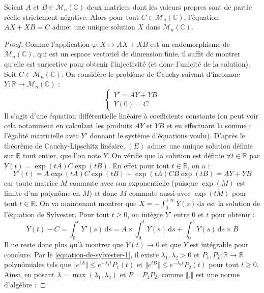 
  \begin{theorem}
    Soient $A$ et $B \in \mathcal{M}_n(\mathbb{C})$ deux matrices dont les valeurs propres sont de partie réelle strictement négative. Alors pour tout $C \in \mathcal{M}_n(\mathbb{C})$, l'équation $AX + XB = C$ admet une unique solution $X$ dans $\mathcal{M}_n(\mathbb{C})$.
  \end{theorem}

  \begin{proof}
    Comme l'application $\varphi : X \mapsto AX + XB$ est un endomorphisme de $\mathcal{M}_n(\mathbb{C})$, qui est un espace vectoriel de dimension finie, il suffit de montrer qu'elle est surjective pour obtenir l'injectivité (et donc l'unicité de la solution). Soit $C \in \mathcal{M}_n(\mathbb{C})$. On considère le problème de Cauchy suivant d'inconnue $Y : \mathbb{R} \rightarrow \mathcal{M}_n(\mathbb{C})$ :
    \[ \begin{cases} Y' = AY + YB \\ Y(0) = C \end{cases} \tag{$E$} \]
    Il s'agit d'une équation différentielle linéaire à coefficients constants (on peut voir cela notamment en calculant les produits $AY$ et $YB$ et en effectuant la somme ; l'égalité matricielle avec $Y'$ donnant le système d'équations voulu). D'après le théorème de Cauchy-Lipschitz linéaire, $(E)$ admet une unique solution définie sur $\mathbb{R}$ tout entier, que l'on note $Y$.
    \newpar
    On vérifie que la solution est définie $\forall t \in \mathbb{R}$ par $Y(t) = \exp(tA) C \exp(tB)$. En effet pour tout $t \in \mathbb{R}$, on a :
    \[ Y'(t) = A \exp(tA) C \exp(tB) + \exp(tA) CB \exp(tB) = AY + YB \]
    car toute matrice $M$ commute avec son exponentielle (puisque $\exp(M)$ est limite d'un polynôme en $M$) et donc $M$ commute aussi avec $\exp(tM)$ pour tout $t \in \mathbb{R}$.
    \newpar
    On va maintenant montrer que $X = - \int_{0}^{+\infty} Y(s) \, \mathrm{d}s$ est la solution de l'équation de Sylvester. Pour tout $t \geq 0$, on intègre $Y'$ entre $0$ et $t$ pour obtenir :
    \[ Y(t) - C = \int_0^t Y'(s) \, \mathrm{d}s = A \times \int_0^t Y(s) \, \mathrm{d}s + \int_0^t Y(s) \, \mathrm{d}s \times B \]
    Il ne reste donc plus qu'à montrer que $Y(t) \longrightarrow 0$ et que $Y$ est intégrable pour conclure. Par le \cref{equation-de-sylvester-1}, il existe $\lambda_1, \lambda_2 > 0$ et $P_1, P_2 : \mathbb{R} \rightarrow \mathbb{R}$ polynômiales tels que $\Vert e^{tA} \Vert \leq e^{- \lambda_1 t} P_1(t)$ et $\Vert e^{tB} \Vert \leq e^{-\lambda_2 t} P_2(t)$ pour tout $t \geq 0$. Ainsi, en posant $\lambda = \max(\lambda_1, \lambda_2)$ et $P = P_1 P_2$, comme $\Vert . \Vert$ est une norme d'algèbre :

\end{proof}

